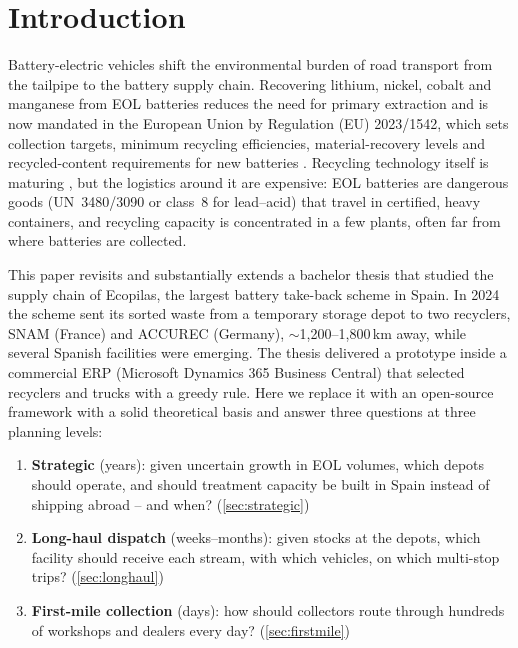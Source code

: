 \documentclass[11pt,a4paper]{article}
\begin{document}
\section{Introduction}
\label{sec:intro}
Battery-electric vehicles shift the environmental burden of road transport from the tailpipe to the battery supply chain. Recovering lithium, nickel, cobalt and manganese from EOL batteries reduces the need for primary extraction and is now mandated in the European Union by Regulation (EU) 2023/1542, which sets collection targets, minimum recycling efficiencies, material-recovery levels and recycled-content requirements for new batteries \citep{EUbattery2023}. Recycling technology itself is maturing \citep{harper2019}, but the logistics around it are expensive: EOL batteries are dangerous goods (UN~3480/3090 or class~8 for lead--acid) that travel in certified, heavy containers, and recycling capacity is concentrated in a few plants, often far from where batteries are collected.

This paper revisits and substantially extends a bachelor thesis \citep{lozano2024} that studied the supply chain of Ecopilas, the largest battery take-back scheme in Spain. In 2024 the scheme sent its sorted waste from a temporary storage depot to two recyclers, SNAM (France) and ACCUREC (Germany), $\sim$1{,}200--1{,}800\,km away, while several Spanish facilities were emerging. The thesis delivered a prototype inside a commercial ERP (Microsoft Dynamics 365 Business Central) that selected recyclers and trucks with a greedy rule. Here we replace it with an open-source framework with a solid theoretical basis and answer three questions at three planning levels:
\begin{enumerate}
\item \textbf{Strategic} (years): given uncertain growth in EOL volumes, which depots should operate, and should treatment capacity be built in Spain instead of shipping abroad -- and when? (\cref{sec:strategic})
\item \textbf{Long-haul dispatch} (weeks--months): given stocks at the depots, which facility should receive each stream, with which vehicles, on which multi-stop trips? (\cref{sec:longhaul})
\item \textbf{First-mile collection} (days): how should collectors route through hundreds of workshops and dealers every day? (\cref{sec:firstmile})
\end{enumerate}
\end{document}
